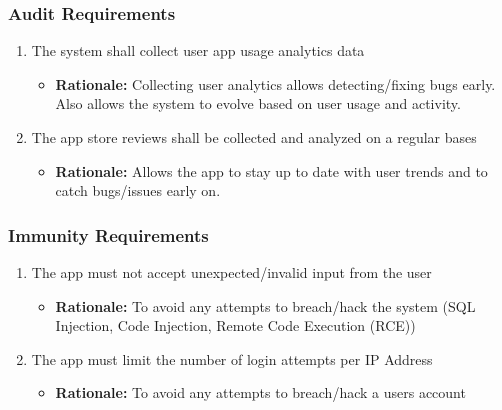 \documentclass[]{article}
\begin{document}
\subsubsection{Audit Requirements}
\label{ssub:audit_requirements}
\begin{enumerate}[{SR-AU}1. ]
\item The system shall collect user app usage analytics data
    \begin{itemize}
        \item \textbf{Rationale:} Collecting user analytics allows detecting/fixing bugs early. Also allows the system to evolve based on user usage and activity.
    \end{itemize}

\item The app store reviews shall be collected and analyzed on a regular bases
    \begin{itemize}
        \item \textbf{Rationale:} Allows the app to stay up to date with user trends and to catch bugs/issues early on.
    \end{itemize}
\end{enumerate}

\subsubsection{Immunity Requirements}
\label{ssub:immunity_requirements}
\begin{enumerate}[{SR-IM}1. ]
\item The app must not accept unexpected/invalid input from the user
    \begin{itemize}
        \item \textbf{Rationale:} To avoid any attempts to breach/hack the system (SQL Injection, Code Injection, Remote Code Execution (RCE))
    \end{itemize}
    
\item The app must limit the number of login attempts per IP Address
    \begin{itemize}
        \item \textbf{Rationale:} To avoid any attempts to breach/hack a users account
    \end{itemize}
\end{enumerate}

\end{document}
